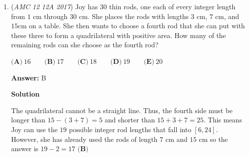\begin{enumerate}
 



\textbf{Solution 5}

Every one of the $20$ people who know each other will shake hands with each of the $10$ people who know no one, so there are $20\cdot 10 = 200$ handshakes here. Each of the $10$ people will also shake hands with each other, so there will be ${10 \choose 2}$ $=45$ handshakes for this case. In total, there are $200+45 = \boxed{\textbf{(B)}\ 245}$ handshakes. 

 



\textbf{Solution 6}

Since there are 10 people who know nobody, the have to shake hands with everybody but themselves, which is $30 - 1 = 29$ people. $10*29=290$. Since people in pairs that belong to this group of 10, every internal handshake was counted twice, resulting in ${10\choose 2}=45$ overcounts. For the case where a person from group of $10$ shakes with a person from the group of $20$, handshakes were only counted once. Unique handshakes involving the $10$ people $=290-45=245$. People from the group of 20 only shakes with the people from the group of 10, and every single one of those handshakes were already counted. Thus there are $0$ new handshakes. The total amount of handshakes is $\boxed{\textbf{(B)}\ 245}$. -erik54321

 
-Benedict T (countmath1)

 


	\item (\textit{AMC 12 12A 2017}) Joy has $30$ thin rods, one each of every integer length from $1 \text{ cm}$ through $30 \text{ cm}$. She places the rods with lengths $3 \text{ cm}$, $7 \text{ cm}$, and $15 \text{cm}$ on a table. She then wants to choose a fourth rod that she can put with these three to form a quadrilateral with positive area. How many of the remaining rods can she choose as the fourth rod?


 $\textbf{(A)}\ 16 \qquad\textbf{(B)}\ 17 \qquad\textbf{(C)}\ 18 \qquad\textbf{(D)}\ 19  \qquad\textbf{(E)}\ 20$

 \textbf{Answer: }B



\textbf{Solution}

The quadrilateral cannot be a straight line. Thus, the fourth side must be longer than $15 - (3 + 7) = 5$ and shorter than $15 + 3 + 7 = 25$. This means Joy can use the $19$ possible integer rod lengths that fall into $[6, 24]$. However, she has already used the rods of length $7$ cm and $15$ cm so the answer is $19 - 2 = 17$ $\boxed{\textbf{(B)}}$




\end{enumerate}
